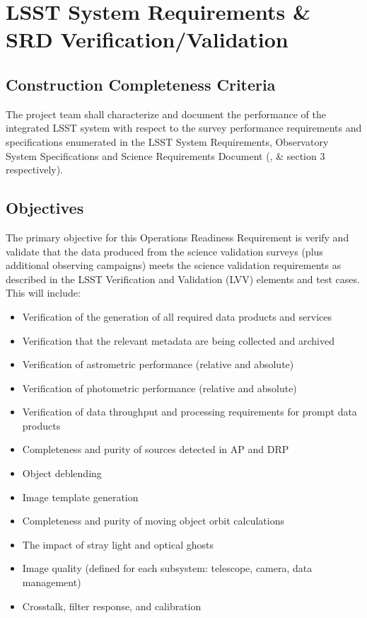 \section{LSST System Requirements \& SRD Verification/Validation}  \label{sec:srd}

\subsection{Construction Completeness Criteria}
The project team shall characterize and document the performance of the integrated LSST system with respect to the survey performance requirements and specifications enumerated in the LSST System Requirements, Observatory System Specifications and Science Requirements Document (,  \&  section 3 respectively).

\subsection{Objectives}

The primary objective for this Operations Readiness Requirement is verify and validate that the data produced from the science validation surveys (plus additional observing campaigns) meets the science validation requirements as described in the LSST Verification and Validation (LVV) elements and test cases. This will include:

\begin{itemize}

	\item Verification of the generation of all required data products and services
 	\item Verification that the relevant metadata are being collected and archived
	\item Verification of astrometric performance (relative and absolute)
	\item Verification of photometric performance (relative and absolute)
	\item Verification of data throughput and processing requirements for prompt data products  
	\item Completeness and purity of sources detected in AP and DRP
	\item Object deblending
	\item Image template generation
	\item Completeness and purity of moving object orbit calculations
	\item The impact of stray light and optical ghosts 
	\item Image quality (defined for each subsystem: telescope, camera, data management)
	\item Crosstalk, filter response, and calibration
	
\end{itemize}

